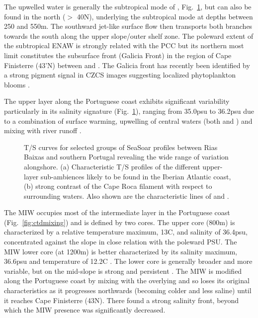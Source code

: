 The upwelled water is generally the subtropical mode of \enawt ,
Fig.~\ref{fig:litts}, but \enawp can also be found in the north
($>$ 40\deg N), underlying the subtropical mode at depths between
250 and 550m. The southward jet-like surface flow then transports
both \enaw branches towards the south along the upper slope/outer
shelf zone. The poleward extent of the subtropical ENAW is
strongly related with the PCC but its northern most limit
constitutes the subsurface front (Galicia Front) in the region of
Cape Finisterre (43'N) between \enawt and \enawp
\citep{Fraga82,Fiuza84}. The Galicia front has recently been
identified by a strong pigment signal in CZCS images suggesting
localized phytoplankton blooms \citep{Peliz96}.

The upper layer along the Portuguese coast exhibits significant
variability particularly in its salinity signature
(Fig.~\ref{fig:litts}), ranging from 35.0psu to 36.2psu due to a
combination of surface warming, upwelling of central waters (both
\enawt and \enawp ) and mixing with river runoff \citep[][in
preparation]{Barton02}.
\begin{figure}
  \centering
   \caption{T/S curves for selected groups of SeaSoar profiles
   between Rias Baixas and southern Portugal revealing the wide
   range of variation alongshore. (a) Characteristic T/S profiles
   of the different upper-layer sub-ambiences likely to be found
   in the Iberian Atlantic coast, (b) strong contrast of the Cape
   Roca filament with respect to surrounding waters. Also shown
   are the characteristic lines of  \enawp and .}
  \label{fig:litts}
\end{figure}

The MIW occupies most of the intermediate layer in the Portuguese
coast (Fig.~\ref{fig:ctdmixing}) and is defined by two cores. The
upper core (800m) is characterized by a relative temperature
maximum, 13\deg C, and salinity of 36.4psu,
\citep{Ambar79,Fiuza97} concentrated against the slope in close
relation with the poleward PSU. The MIW lower core (at 1200m) is
better characterized by its salinity maximum, 36.6psu and
temperature of 12.2\deg C \citep{Ambar79}. The lower core is
generally broader and more variable, but on the mid-slope is
strong and persistent \citep{Hamann96}. The MIW is modified along
the Portuguese coast by mixing with the overlying \enaw and so
loses its original characteristics as it progresses northwards
(becoming colder and less saline) until it reaches Cape Finisterre
(43\deg N). There \citet{Rios92} found a strong salinity front,
beyond which the MIW presence was significantly decreased.

